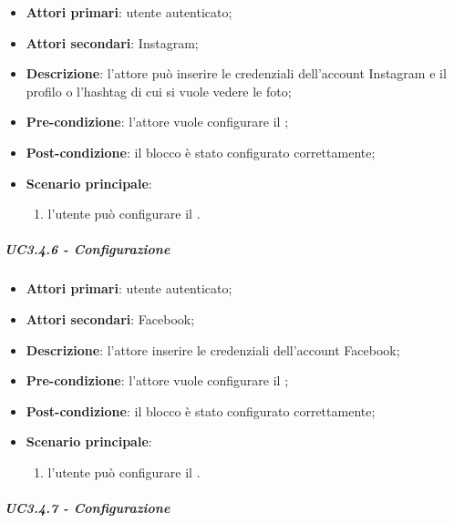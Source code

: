 \begin{itemize}
\item \textbf{Attori primari}: utente autenticato;

\item \textbf{Attori secondari}: Instagram;

\item \textbf{Descrizione}: l'attore può inserire le credenziali dell'account Instagram e il profilo o l'hashtag di cui si vuole vedere le foto;

\item \textbf{Pre-condizione}: l'attore vuole configurare il \BInstagram{};

\item \textbf{Post-condizione}:  il blocco è stato configurato correttamente;

\item \textbf{Scenario principale}:
\begin{enumerate}
\item  l'utente può configurare il \BInstagram{}.

\end{enumerate}
\end{itemize}

\subparagraph{UC3.4.6 - Configurazione \BFacebook{}}

\begin{itemize}
\item \textbf{Attori primari}: utente autenticato;

\item \textbf{Attori secondari}: Facebook;

\item \textbf{Descrizione}: l'attore inserire le credenziali dell'account Facebook;

\item \textbf{Pre-condizione}: l'attore vuole configurare il \BFacebook{};

\item \textbf{Post-condizione}:  il blocco è stato configurato correttamente;

\item \textbf{Scenario principale}:
\begin{enumerate}
\item  l'utente può configurare il \BFacebook{}.

\end{enumerate}
\end{itemize}

\subparagraph{UC3.4.7 - Configurazione \BMessenger{}}

